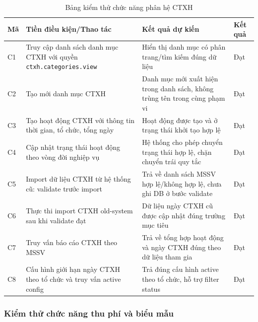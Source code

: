 \begin{table}[H]
\centering
\renewcommand{\arraystretch}{1.2}
\small
\begin{tabular}{|p{2.0cm}|p{4.8cm}|p{4.5cm}|p{3.2cm}|}
\hline
\textbf{Mã} & \textbf{Tiền điều kiện/Thao tác} & \textbf{Kết quả dự kiến} & \textbf{Kết quả} \\
\hline
C1 & Truy cập danh sách danh mục CTXH với quyền \texttt{ctxh.categories.view} & Hiển thị danh mục có phân trang/tìm kiếm đúng dữ liệu & Đạt \\
\hline
C2 & Tạo mới danh mục CTXH & Danh mục mới xuất hiện trong danh sách, không trùng tên trong cùng phạm vi & Đạt \\
\hline
C3 & Tạo hoạt động CTXH với thông tin thời gian, tổ chức, tổng ngày & Hoạt động được tạo và ở trạng thái khởi tạo hợp lệ & Đạt \\
\hline
C4 & Cập nhật trạng thái hoạt động theo vòng đời nghiệp vụ & Hệ thống cho phép chuyển trạng thái hợp lệ, chặn chuyển trái quy tắc & Đạt \\
\hline
C5 & Import dữ liệu CTXH từ hệ thống cũ: validate trước import & Trả về danh sách MSSV hợp lệ/không hợp lệ, chưa ghi DB ở bước validate & Đạt \\
\hline
C6 & Thực thi import CTXH old-system sau khi validate đạt & Dữ liệu ngày CTXH cũ được cập nhật đúng trường mục tiêu & Đạt \\
\hline
C7 & Truy vấn báo cáo CTXH theo MSSV & Trả về tổng hợp hoạt động và ngày CTXH đúng theo dữ liệu tham gia & Đạt \\
\hline
C8 & Cấu hình giới hạn ngày CTXH theo tổ chức và truy vấn active config & Trả đúng cấu hình active theo tổ chức, hỗ trợ filter status & Đạt \\
\hline
\end{tabular}
\caption{Bảng kiểm thử chức năng phân hệ CTXH}
\end{table}

\subsubsection{Kiểm thử chức năng thu phí và biểu mẫu}


